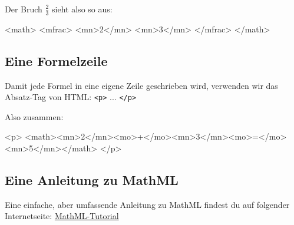 Der Bruch $\frac{2}{3}$ sieht also so aus:

\begin{codeHTML}
<math>
	<mfrac>
		<mn>2</mn>
		<mn>3</mn>
	</mfrac>
</math>
\end{codeHTML}

\subsection*{Eine Formelzeile}

Damit jede Formel in eine eigene Zeile geschrieben wird, verwenden wir das Absatz-Tag von HTML: \texttt{<p>} ... \texttt{</p>}

Also zusammen:
\begin{codeHTML}
<p>
	<math><mn>2</mn><mo>+</mo><mn>3</mn><mo>=</mo><mn>5</mn></math>
</p>
\end{codeHTML}

\subsection*{Eine Anleitung zu MathML}

Eine einfache, aber umfassende Anleitung zu MathML findest du auf folgender Internetseite: \href{https://www.math-it.de/Publikationen/MathML_de.html}{MathML-Tutorial}